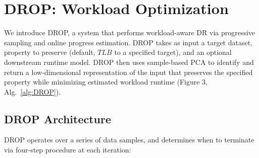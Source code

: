 \section{DROP: Workload Optimization}
\label{sec:algo}

We introduce DROP, a system that performs workload-aware DR via progressive sampling and online progress estimation.
DROP takes as input a target dataset, property to preserve (default, $TLB$ to a specified target), and an optional downstream runtime model.
DROP then uses sample-based PCA to identify and return a low-dimensional representation of the input that preserves the specified property while minimizing estimated workload runtime (Figure 3, Alg.~\ref{alg:DROP}).

\subsection{DROP Architecture}
\label{subsec:arch}
DROP operates over a series of data samples, and determines when to terminate via  four-step procedure at each iteration: %

